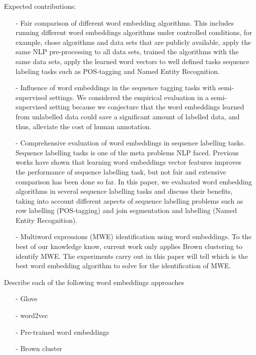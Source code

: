 \documentclass[11pt]{article}
\begin{document}
Expected contributions:
\begin{itemize}
\item[-] Fair comparison of different word embedding algorithms. This
  includes running different word embeddings algorithms under controlled
  conditions, for example, chose algorithms and data sets that are
  publicly available, apply the same NLP pre-processing to all data
  sets, trained the algorithms with the same data sets, apply the
  learned word vectors to well defined tasks sequence labeling tasks
  such as POS-tagging and Named Entity Recognition.

\item[-] Influence of word embeddings in the sequence tagging tasks with
  semi-supervised settings. We considered the empirical evaluation in a
  semi-supervised setting because we conjecture that the word embeddings
  learned from unlabelled data could save a significant amount of
  labelled data, and thus, alleviate the cost of human annotation.

\item[-] Comprehensive evaluation of word embeddings in sequence
  labelling tasks.  Sequence labelling tasks is one of the meta problems
  NLP faced. Previous works have shown that learning word embeddings
  vector features improves the performance of sequence labelling task,
  but not fair and extensive comparison has been done so far. In this
  paper, we evaluated word embedding algorithms in several sequence
  labelling tasks and discuss their benefits, taking into account
  different aspects of sequence labelling problems such as row labelling
  (POS-tagging) and join segmentation and labelling (Named Entity
  Recognition).

\item[-] Multiword expressions (MWE) identification using word
  embeddings.  To the best of our knowledge know, current work only
  applies Brown clustering to identify MWE. The experiments carry out in
  this paper will tell which is the best word embedding algorithm to
  solve for the identification of MWE.
\end{itemize}


{\color{blue} Describe each of the following word embeddings approaches}
\begin{itemize}
\item[-] Glove \cite{pennington2014glove}
\item[-] word2vec \cite{Mikolov13}
\item[-] Pre-trained word embeddings \cite{Turian10wordrepresentations}
\item[-] Brown cluster \cite{Brown92class-basedn-gram}
\end{itemize}
\end{document}
